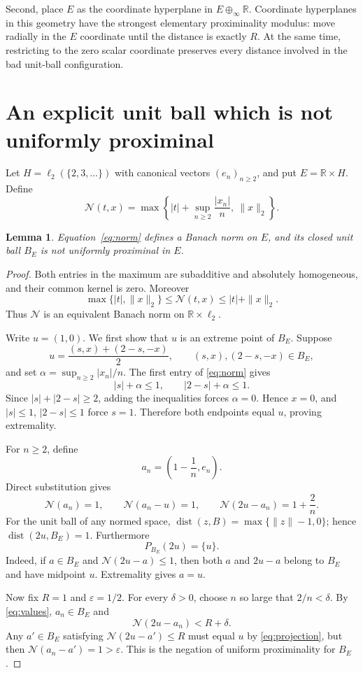 \documentclass[11pt,a4paper]{article}
\newtheorem{lemma}{Lemma}
\newcommand{\R}{\mathbb R}
\newcommand{\N}{\mathcal N}
\newcommand{\dist}{\operatorname{dist}}
\begin{document}
Second, place $E$ as the coordinate hyperplane in $E\oplus_\infty\R$.
Coordinate hyperplanes in this geometry have the strongest elementary
proximinality modulus: move radially in the $E$ coordinate until the distance
is exactly $R$. At the same time, restricting to the zero scalar coordinate
preserves every distance involved in the bad unit-ball configuration.

\section{An explicit unit ball which is not uniformly proximinal}

Let $H=\ell_2(\{2,3,\ldots\})$ with canonical vectors $(e_n)_{n\ge2}$, and
put $E=\R\times H$. Define
\begin{equation}\label{eq:norm}
 \N(t,x)=\max\left\{|t|+\sup_{n\ge2}\frac{|x_n|}{n},\ \|x\|_2\right\}.
\end{equation}

\begin{lemma}\label{lem:badball}
Equation~\eqref{eq:norm} defines a Banach norm on $E$, and its closed unit
ball $B_E$ is not uniformly proximinal in $E$.
\end{lemma}

\begin{proof}
Both entries in the maximum are subadditive and absolutely homogeneous, and
their common kernel is zero. Moreover
\[
 \max\{|t|,\|x\|_2\}\le \N(t,x)\le |t|+\|x\|_2.
\]
Thus $\N$ is an equivalent Banach norm on $\R\times\ell_2$.

Write $u=(1,0)$. We first show that $u$ is an extreme point of $B_E$.
Suppose
\[
 u=\frac{(s,x)+(2-s,-x)}2,
 \qquad (s,x),(2-s,-x)\in B_E,
\]
and set $\alpha=\sup_{n\ge2}|x_n|/n$. The first entry of
\eqref{eq:norm} gives
\[
 |s|+\alpha\le1,
 \qquad |2-s|+\alpha\le1.
\]
Since $|s|+|2-s|\ge2$, adding the inequalities forces $\alpha=0$.
Hence $x=0$, and $|s|\le1$, $|2-s|\le1$ force $s=1$. Therefore both
endpoints equal $u$, proving extremality.

For $n\ge2$, define
\[
 a_n=\left(1-\frac1n,e_n\right).
\]
Direct substitution gives
\begin{equation}\label{eq:values}
 \N(a_n)=1,
 \qquad \N(a_n-u)=1,
 \qquad \N(2u-a_n)=1+\frac2n.
\end{equation}
For the unit ball of any normed space,
$\dist(z,B)=\max\{\|z\|-1,0\}$; hence
$\dist(2u,B_E)=1$. Furthermore
\begin{equation}\label{eq:projection}
 P_{B_E}(2u)=\{u\}.
\end{equation}
Indeed, if $a\in B_E$ and $\N(2u-a)\le1$, then both $a$ and $2u-a$
belong to $B_E$ and have midpoint $u$. Extremality gives $a=u$.

Now fix $R=1$ and $\varepsilon=1/2$. For every $\delta>0$, choose $n$
so large that $2/n<\delta$. By \eqref{eq:values}, $a_n\in B_E$ and
\[
 \N(2u-a_n)<R+\delta.
\]
Any $a'\in B_E$ satisfying $\N(2u-a')\le R$ must equal $u$ by
\eqref{eq:projection}, but then
$\N(a_n-a')=1>\varepsilon$. This is the negation of uniform
proximinality for $B_E$.
\end{proof}
\end{document}
